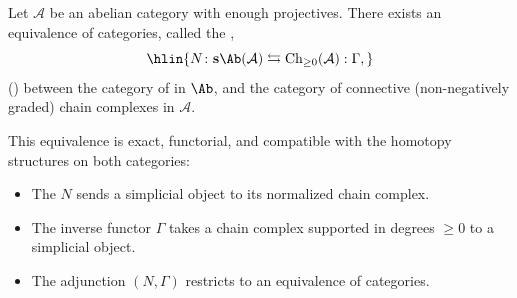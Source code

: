 







\begin{theorem}
    Let $\mathcal{A}$ be an abelian category with enough projectives. There exists an equivalence of categories, called the ,
    $$\hlin{N \colon \mathbf{s}\Ab(\mathcal{A}) \leftrightarrows \mathrm{Ch}_{\geq 0}(\mathcal{A}) : \Gamma,}$$
    ()
    between the category of  in $\Ab$, and the category of connective (non-negatively graded) chain complexes in $\mathcal{A}$.

    This equivalence is exact, functorial, and compatible with the homotopy structures on both categories:
    \begin{itemize}
        \item The  $N$ sends a simplicial object to its normalized chain complex.
        \item The inverse functor $\Gamma$ takes a chain complex supported in degrees $\geq 0$ to a simplicial object.
        \item The adjunction $(N, \Gamma)$ restricts to an equivalence of categories.
    \end{itemize}
\end{theorem}

